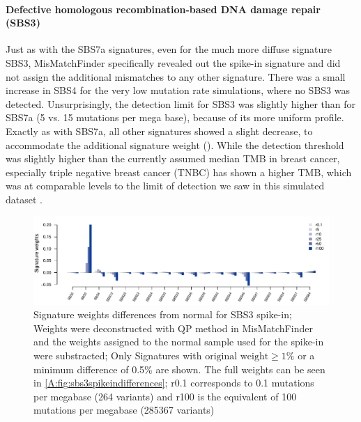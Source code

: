 \paragraph{Defective homologous recombination-based DNA damage repair (SBS3)}
\label{mmf-sec:mbcSim}

Just as with the SBS7a signatures, even for the much more diffuse signature SBS3, MisMatchFinder specifically revealed out the spike-in signature and did not assign the additional mismatches to any other signature. There was a small increase in SBS4 for the very low mutation rate simulations, where no SBS3 was detected. Unsurprisingly, the detection limit for SBS3 was slightly higher than for SBS7a (5 vs. 15 mutations per mega base), because of its more uniform profile. Exactly as with SBS7a, all other signatures showed a slight decrease, to accommodate the additional signature weight (). While the detection threshold was slightly higher than the currently assumed median TMB in breast cancer, especially triple negative breast cancer (TNBC) has shown a higher TMB, which was at comparable levels to the limit of detection we saw in this simulated dataset \cite{BarrosoSousa2020}.

\begin{figure}[ht]
\centering
\includegraphics[width=.99\linewidth]{Figures/MisMatchFinder/SBS3SpikeInSignatureDifferencesFocussed.pdf}
\caption[Signature weights differences from normal for SBS3 spike-in]{Signature weights differences from normal for SBS3 spike-in; Weights were deconstructed with QP method in MisMatchFinder and the weights assigned to the normal sample used for the spike-in were substracted; Only Signatures with $\text{original weight}\geq 1\%$ or a minimum difference of 0.5\% are shown. The full weights can be seen in \protect\autoref{A:fig:sbs3spikeindifferences}; r0.1 corresponds to 0.1 mutations per megabase (264 variants) and r100 is the equivalent of 100 mutations per megabase (285367 variants)}\label{fig:mmf-spikeSBS3signatures}
\end{figure}

